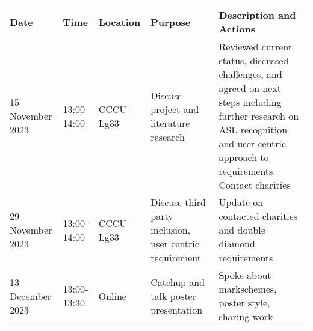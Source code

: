 \begin{longtable}{|p{2cm}|p{2cm}|p{3cm}|p{4cm}|p{4cm}|}
    \hline
    \textbf{Date}    & \textbf{Time} & \textbf{Location} & \textbf{Purpose}                                        & \textbf{Description and Actions}                                                                                                                                                   \\
    \hline
    \endfirsthead
    15 November 2023 & 13:00-14:00   & CCCU - Lg33       & Discuss project and literature research                 & Reviewed current status, discussed challenges, and agreed on next steps including further research on ASL recognition and user-centric approach to requirements. Contact charities \\
    \hline
    29 November 2023 & 13:00-14:00   & CCCU - Lg33       & Discuss third party inclusion, user centric requirement & Update on contacted charities and double diamond requirements                                                                                                                      \\
    \hline
    13 December 2023 & 13:00-13:30   & Online            & Catchup and talk poster presentation                    & Spoke about markschemes, poster style, sharing work                                                                                                                                \\
    \hline
\end{longtable}